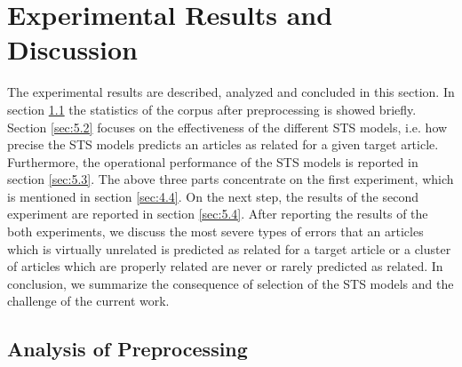 
\section{Experimental Results and Discussion}
\label{sec:5}

The experimental results are described, analyzed and concluded in this section. In section \ref{sec:5.1} the statistics of the corpus after preprocessing is showed briefly. Section \ref{sec:5.2} focuses on the effectiveness of the different STS models, i.e. how precise the STS models predicts an articles as related for a given target article. Furthermore, the operational performance of the STS models is reported in section \ref{sec:5.3}. The above three parts concentrate on the first experiment, which is mentioned in section \ref{sec:4.4}. On the next step, the results of the second experiment are reported in section \ref{sec:5.4}. After reporting the results of the both experiments, we discuss the most severe types of errors that an articles which is virtually unrelated is predicted as related for a target article or a cluster of articles which are properly related are never or rarely predicted as related. In conclusion, we summarize the consequence of selection of the STS models and the challenge of the current work. 

\subsection{Analysis of Preprocessing}
\label{sec:5.1}

